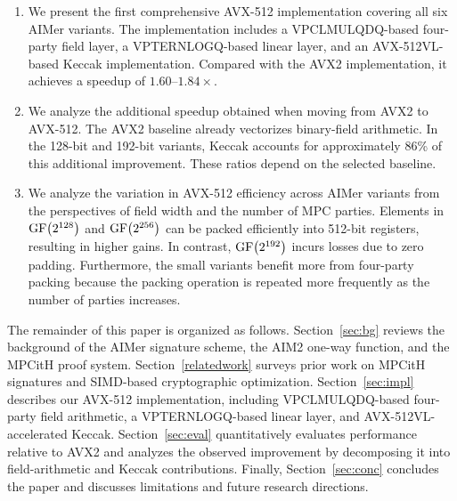 \begin{enumerate}[label=\arabic*., leftmargin=*]
\item We present the first comprehensive AVX-512 implementation covering all six AIMer variants. The implementation includes a VPCLMULQDQ-based four-party field layer, a VPTERNLOGQ-based linear layer, and an AVX-512VL-based Keccak implementation. Compared with the AVX2 implementation, it achieves a speedup of $1.60$--$1.84\times$.

\item We analyze the additional speedup obtained when moving from AVX2
to AVX-512. The AVX2 baseline already vectorizes binary-field arithmetic.
In the 128-bit and 192-bit variants, Keccak accounts for approximately
86\% of this additional improvement. These ratios depend on the selected baseline.

\item We analyze the variation in AVX-512 efficiency across AIMer variants from the perspectives of field width and the number of MPC parties. Elements in $\operatorname{GF}\bigl(2^{128}\bigr)$ and $\operatorname{GF}\bigl(2^{256}\bigr)$ can be packed
efficiently into 512-bit registers, resulting in higher gains. In contrast, $\operatorname{GF}\bigl(2^{192}\bigr)$ incurs losses due to zero padding. Furthermore, the small variants benefit more from four-party packing because the packing operation is repeated more frequently as the number of parties increases.
\end{enumerate}

The remainder of this paper is organized as follows. Section~\ref{sec:bg} reviews the background of the AIMer signature scheme, the AIM2 one-way function, and the MPCitH proof system. Section~\ref{relatedwork} surveys prior work on MPCitH signatures and SIMD-based cryptographic optimization. Section~\ref{sec:impl} describes our AVX-512 implementation, including VPCLMULQDQ-based four-party field arithmetic, a VPTERNLOGQ-based linear layer, and AVX-512VL-accelerated Keccak. Section~\ref{sec:eval} quantitatively evaluates performance relative to AVX2 and analyzes the observed improvement by decomposing it into field-arithmetic and Keccak contributions. Finally, Section~\ref{sec:conc} concludes the paper and discusses limitations and future research directions.
